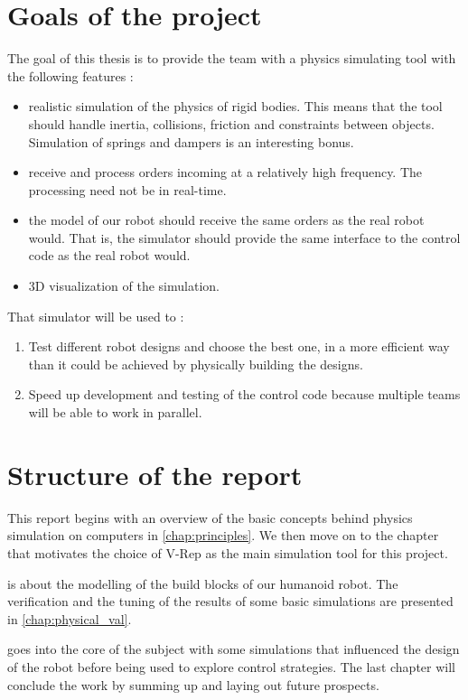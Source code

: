 \section{Goals of the project}
The goal of this thesis is to provide the team with a physics simulating tool with the following features :
\begin{itemize}
\item realistic simulation of the physics of rigid bodies. This means that the tool should handle inertia, collisions, friction and constraints between objects. Simulation of springs and dampers is an interesting bonus.
\item receive and process orders incoming at a relatively high frequency. The processing need not be in real-time.
\item the model of our robot should receive the same orders as the real robot would. That is, the simulator should provide the same interface to the control code as the real robot would. 
\item 3D visualization of the simulation.
\end{itemize}

That simulator will be used to :
\begin{enumerate}
\item Test different robot designs and choose the best one, in a more efficient way than it could be achieved by physically building the designs.
\item Speed up development and testing of the control code because multiple teams will be able to work in parallel. 
\end{enumerate}

\section{Structure of the report}
This report begins with an overview of the basic concepts behind physics simulation on computers in \cref{chap:principles}. We then move on to the chapter that motivates the choice of V-Rep as the main simulation tool for this project.

 is about the modelling of the build blocks of our humanoid robot. The verification and the tuning of the results of some basic simulations are presented in \cref{chap:physical_val}.

 goes into the core of the subject with some simulations that influenced the design of the robot before being used to explore control strategies. The last chapter will conclude the work by summing up and laying out future prospects.